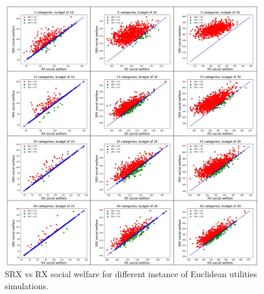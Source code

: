 \documentclass[runningheads]{llncs}
\begin{document}
\begin{subappendices}
\begin{figure}[t]
\begin{center}
\includegraphics[width=14cm]{simulation/unit_scatters_no_prob.png}
\caption{SRX vs RX social welfare for different instance of Euclidean utilities simulations.
}\label{fig:scatter_all1}
\end{center}
\end{figure}


\end{subappendices}
\end{document}
